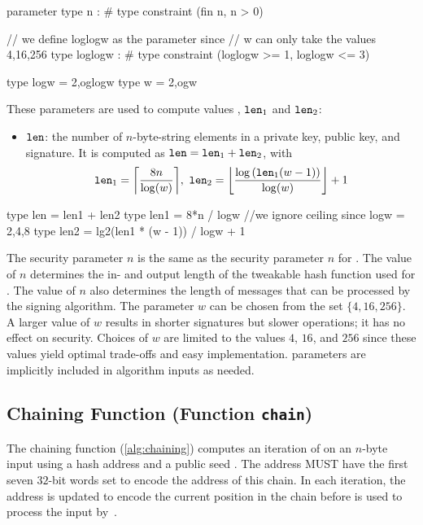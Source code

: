 \begin{code}
  parameter
    type n : #
    type constraint (fin n, n > 0)

    // we define loglogw as the parameter since
    // w can only take the values 4,16,256
    type loglogw : #
    type constraint (loglogw >= 1, loglogw <= 3)

  type logw = 2^^loglogw
  type w = 2^^logw
\end{code}

These parameters are used to compute values \len, $\texttt{len}_1$ and
$\texttt{len}_2$:
\begin{itemize}
  \item $\texttt{len}$: the number of $n$-byte-string elements in a \wotsp private
        key, public key, and signature. It is computed as $\texttt{len} =
        \texttt{len}_1 + \texttt{len}_2$, with
        \begin{equation*}
          \len_1 = \ceil*{\frac{8n}{\log(w)}},\
          \len_2 = \floor*{\frac{\log{(\len_1(w - 1))}}{\log(w)}} + 1
        \end{equation*}
\end{itemize}

\begin{code}
  type len = len1 + len2
  type len1 = 8*n / logw //we ignore ceiling since logw = 2,4,8
  type len2 = lg2(len1 * (w - 1)) / logw + 1
\end{code}

The security parameter $n$ is the same as the security parameter $n$ for \spx. 
The value of $n$ determines the in- and output length of the tweakable hash 
function used for \wotsp. The value of $n$ also determines 
the length of messages that can be processed by the \wotsp signing algorithm. 
The parameter $w$ can be chosen from the set $\{4, 16, 256\}$. 
A larger value of $w$ results in shorter signatures but slower
operations; it has no effect on security.
Choices of $w$ are limited to the values $4$, $16$, and $256$ since these values 
yield optimal trade-offs and easy implementation. \wotsp parameters are 
implicitly included in algorithm inputs as needed.

\subsection{\wotsp Chaining Function (Function \texttt{chain})}
The chaining function (\autoref{alg:chaining}) computes an iteration of 
\sphincsF on an $n$-byte input using a \wotsp hash address \adrs and a 
public seed \pseed.
The address \adrs MUST have the first seven $32$-bit words set to encode the 
address of this chain.  In each iteration, the address is updated to encode
the current position in the chain before \adrs is used to 
process the input by~\sphincsF.

